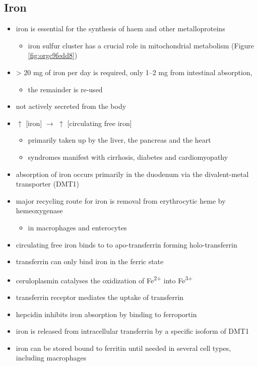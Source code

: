 \documentclass[12pt]{scrartcl}
\begin{document}
\subsection{Iron}
\label{sec:org3ba9cbe}
\begin{itemize}
\item iron is essential for the synthesis of haem and other
metalloproteins
\begin{itemize}
\item iron sulfur cluster has a crucial role in mitochondrial metabolism (Figure \ref{fig:orgc9fedd8})
\end{itemize}
\item \textgreater{} 20 mg of iron per day is required, only 1–2 mg from intestinal absorption,
\begin{itemize}
\item the remainder is re-used
\end{itemize}
\item not actively secreted from the body
\item \(\uparrow\) [iron] \(\to\) \(\uparrow\) [circulating free iron]
\begin{itemize}
\item primarily taken up by the liver, the pancreas and the heart
\item syndromes manifest with cirrhosis, diabetes and cardiomyopathy
\end{itemize}
\item absorption of iron occurs primarily in the duodenum via the
divalent-metal transporter (DMT1)
\item major recycling route for iron is removal from erythrocytic heme by
hemeoxygenase
\begin{itemize}
\item in macrophages and enterocytes
\end{itemize}
\item circulating free iron binds to to apo-transferrin forming holo-transferrin
\item transferrin can only bind iron in the ferric state
\item ceruloplasmin catalyses the oxidization of Fe\textsuperscript{2+} into Fe\textsuperscript{3+}
\item transferrin receptor mediates the uptake of transferrin
\item hepcidin inhibits iron absorption by binding to ferroportin
\item iron is released from intracellular transferrin by a specific isoform of DMT1
\item iron can be stored bound to ferritin until needed in several cell
types, including macrophages
\end{itemize}
\end{document}
